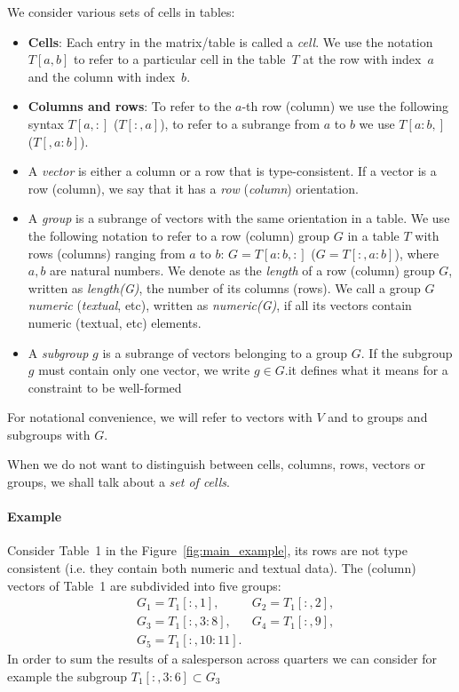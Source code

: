 \documentclass{ecai}
\newcommand{\groups}{\ensuremath{\mathcal{G}}\xspace}
\newcommand{\range}[3]{\ensuremath{#1[#2,#3]}}
\newcommand{\rangeto}[2]{#1{:}#2}
\newcommand{\rangeall}{:}
\begin{document}
We consider various sets of cells in tables:
\begin{itemize}
  \item {\bf Cells}: Each entry in the matrix/table is called  a \textit{cell}.
  We use the notation $T[a,b]$ to refer to a particular cell in the table~$T$ at the row with index~$a$ and the column with index~$b$.
  \item {\bf Columns and rows}: To refer to the $a$-th row (column) we use the following syntax $T[a,{:}]$ ($T[{:},a]$), to refer to a subrange from $a$ to $b$ we use $T[a{:}b,]$ ($T[,a{:}b]$).
  \item
  A \textit{vector} is either a column or a row that is type-consistent.
  If a vector is a row (column), we say that it has a \textit{row} (\textit{column}) orientation.
  \item
  A \textit{group} is a subrange of vectors with the same orientation in a table.
  We use the following notation to refer to a row (column) group $G$ in a table $T$ with rows (columns) ranging from $a$ to $b$: $G = T[a{:}b,:]$ ($G = T[{:},a{:}b]$), where $a,b$ are natural numbers.
  We denote as the \textit{length} of a row (column) group $G$, written as \textit{length(G)}, the number of its columns (rows). We call a group $G$ \textit{numeric} (\textit{textual}, etc), written as \textit{numeric(G)}, if all its vectors contain numeric (textual, etc) elements.
  \item
 A \textit{subgroup} $g$ is a subrange of vectors belonging to a group $G$. If the subgroup $g$ must contain only one vector, we write $g \in G$.it defines what it means for a constraint to be well-formed
\end{itemize}
For notational convenience, we will refer to vectors with $V$ and to groups and subgroups with $G$.

When we do not want to distinguish between cells, columns, rows, vectors or groups, we shall talk about a {\em set of cells}.

\paragraph{Example}
Consider Table~1 in the Figure~\ref{fig:main_example}, its rows are not type consistent (i.e. they contain both numeric and textual data).
The (column) vectors of Table~1 are subdivided into five groups:
\begin{align*}
&G_1 = \range{T_1}{\rangeall}{1},
&G_2 = \range{T_1}{\rangeall}{2},\\
&G_3 = \range{T_1}{\rangeall}{\rangeto{3}{8}},
&G_4 = \range{T_1}{\rangeall}{9},\\
&G_5 = \range{T_1}{\rangeall}{\rangeto{10}{11}}.
\end{align*}
In order to sum the results of a salesperson across quarters we can consider for example the subgroup $\range{T_1}{\rangeall}{\rangeto{3}{6}} \subset G_3$
\end{document}
